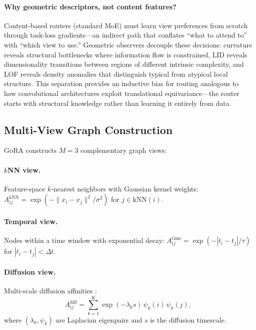 \documentclass[11pt,a4paper]{article}
\newcommand{\ours}{\textsc{GoRA}}  %
\begin{document}
\paragraph{Why geometric descriptors, not content features?}
Content-based routers (standard MoE) must learn view preferences
from scratch through task-loss gradients---an indirect path that
conflates ``what to attend to'' with ``which view to use.''
Geometric observers decouple these decisions: curvature reveals
structural bottlenecks where information flow is constrained, LID
reveals dimensionality transitions between regions of different
intrinsic complexity, and LOF reveals density anomalies that distinguish
typical from atypical local structure.
This separation provides an inductive bias for routing analogous to how
convolutional architectures exploit translational equivariance---the
router starts with structural knowledge rather than learning it
entirely from data.

\subsection{Multi-View Graph Construction}
\label{sec:views}

\ours{} constructs $M = 3$ complementary graph views:

\paragraph{$k$NN view.}
Feature-space $k$-nearest neighbors with Gaussian kernel weights:
$A_{ij}^{\text{kNN}} = \exp(-\|x_i - x_j\|^2 / \sigma^2)$
for $j \in \text{kNN}(i)$.

\paragraph{Temporal view.}
Nodes within a time window with exponential decay:
$A_{ij}^{\text{time}} = \exp(-|t_i - t_j| / \tau)$
for $|t_i - t_j| < \Delta t$.

\paragraph{Diffusion view.}
Multi-scale diffusion affinities \citep{coifman2006diffusion}:
\[
  A_{ij}^{\text{diff}} = \sum_{k=1}^{K} \exp(-\lambda_k s)\,
  \psi_k(i)\,\psi_k(j),
\]
where $(\lambda_k, \psi_k)$ are Laplacian eigenpairs and $s$ is the
diffusion timescale.

\end{document}
